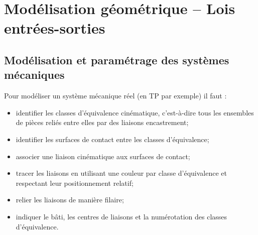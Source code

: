 \setchapterpreamble[u]{\margintoc}

\chapter{Modélisation géométrique -- Lois entrées-sorties}

\marginnote[8cm]{
}

% 
% 
\section{Modélisation et paramétrage des systèmes mécaniques}
\begin{methode}

Pour modéliser un système mécanique réel (en TP par exemple) il faut : 
\begin{itemize}
\item identifier les classes d'équivalence cinématique, c'est-à-dire tous les ensembles de pièces reliés entre elles par des liaisons encastrement;
\item identifier les surfaces de contact entre les classes d'équivalence;
\item associer une liaison cinématique aux surfaces de contact;
\item tracer les liaisons en utilisant une couleur par classe d'équivalence et respectant leur positionnement relatif;
\item relier les liaisons de manière filaire;
\item indiquer le bâti, les centres de liaisons et la numérotation des classes d'équivalence.
\end{itemize}
\end{methode}


